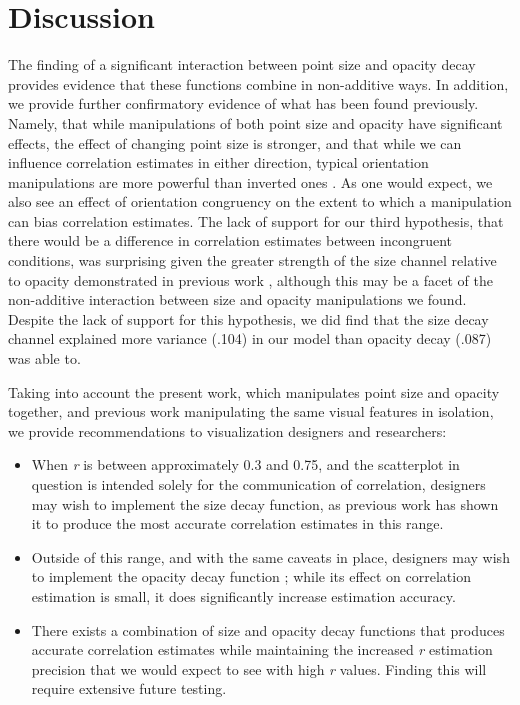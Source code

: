 \documentclass[manuscript, review, anonymous, screen]{acmart}
\providecommand{\tightlist}{%
  \setlength{\itemsep}{0pt}\setlength{\parskip}{0pt}}\usepackage{longtable,booktabs,array}
\begin{document}
\hypertarget{sec-discussion}{%
\section{Discussion}\label{sec-discussion}}

The finding of a significant interaction between point size and opacity
decay provides evidence that these functions combine in non-additive
ways. In addition, we provide further confirmatory evidence of what has
been found previously. Namely, that while manipulations of both point
size and opacity have significant effects, the effect of changing point
size is stronger, and that while we can influence correlation estimates
in either direction, typical orientation manipulations are more powerful
than inverted ones \citep{strain_2023, strain_2023b}. As one would
expect, we also see an effect of orientation congruency on the extent to
which a manipulation can bias correlation estimates. The lack of support
for our third hypothesis, that there would be a difference in
correlation estimates between incongruent conditions, was surprising
given the greater strength of the size channel relative to opacity
demonstrated in previous work \citep{strain_2023, strain_2023b},
although this may be a facet of the non-additive interaction between
size and opacity manipulations we found. Despite the lack of support for
this hypothesis, we did find that the size decay channel explained more
variance (.104) in our model than opacity decay (.087) was able to.

Taking into account the present work, which manipulates point size and
opacity together, and previous work manipulating the same visual
features in isolation, we provide recommendations to visualization
designers and researchers:

\begin{itemize}
\tightlist
\item
  When \emph{r} is between approximately 0.3 and 0.75, and the
  scatterplot in question is intended solely for the communication of
  correlation, designers may wish to implement the size decay function,
  as previous work \citep{strain_2023b} has shown it to produce the most
  accurate correlation estimates in this range.
\item
  Outside of this range, and with the same caveats in place, designers
  may wish to implement the opacity decay function \citep{strain_2023};
  while its effect on correlation estimation is small, it does
  significantly increase estimation accuracy.
\item
  There exists a combination of size and opacity decay functions that
  produces accurate correlation estimates while maintaining the
  increased \emph{r} estimation precision that we would expect to see
  with high \emph{r} values. Finding this will require extensive future
  testing.
\end{itemize}
\end{document}
